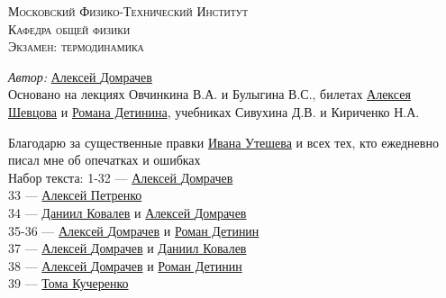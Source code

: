 
	\begin{titlepage}
		

		
		
		\center %
		
		
		
		
		\textsc{\LARGE Московский Физико-Технический Институт}\\[1,5cm] %
		\textsc{\Large Кафедра общей физики}\\[0.5cm]
		\textsc{\large Экзамен: термодинамика}\\[0.5cm] %
		
		

		
		
		
		
			\begin{center} \large
				\emph{Автор:} \href{https://vk.com/domrachev_alexey}{Алексей \textsf{Домрачев}}\\
				Основано на лекциях Овчинкина В.А. и Булыгина В.С., билетах \href{https://vk.com/shevtsovalexey}{Алексея Шевцова} и \href{https://vk.com/detinin_roman}{Романа Детинина}, учебниках Сивухина Д.В. и Кириченко Н.А.
			\end{center}
			Благодарю за существенные правки \href{https://vk.com/uteshevia}{Ивана Утешева} и всех тех, кто ежедневно писал мне об опечатках и ошибках\\
			Набор текста: 
			1-32 --- \href{https://vk.com/domrachev_alexey}{Алексей \textsf{Домрачев}}\\
			33 --- \href{https://vk.com/id136779374}{Алексей Петренко}\\
			34 --- \href{https://vk.com/danikow}{Даниил Ковалев} и \href{https://vk.com/domrachev_alexey}{Алексей \textsf{Домрачев}}  \\
			35-36 ---  \href{https://vk.com/domrachev_alexey}{Алексей \textsf{Домрачев}} и \href{https://vk.com/detinin_roman}{Роман Детинин}\\
			37 --- \href{https://vk.com/domrachev_alexey}{Алексей \textsf{Домрачев}} и \href{https://vk.com/danikow}{Даниил Ковалев}\\
			38 --- \href{https://vk.com/domrachev_alexey}{Алексей \textsf{Домрачев}} и \href{https://vk.com/detinin_roman}{Роман Детинин}\\
			39 --- \href{https://vk.com/id212233817}{Тома Кучеренко}
		

\end{titlepage}

